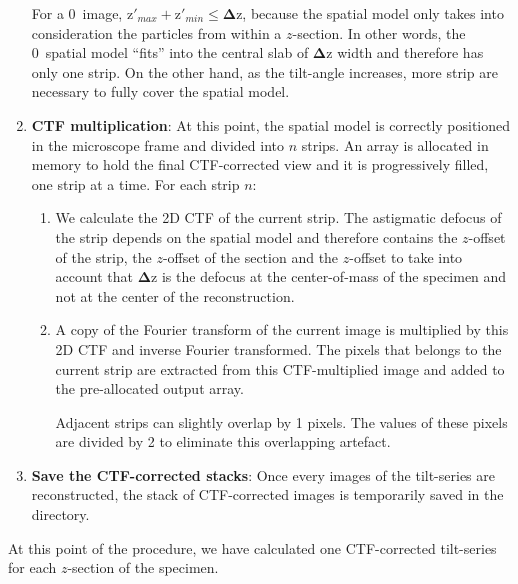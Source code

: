 \begin{enumerate}
    \begin{note}For a 0\textdegree\ image, $\bm{\mathrm{z}}'_{max} + \bm{\mathrm{z}}'_{min} \leqslant \bm{\Delta \mathrm{z}}$, because the spatial model only takes into consideration the particles from within a $z$-section. In other words, the 0\textdegree \ spatial model ``fits'' into the central slab of $\bm{\Delta \mathrm{z}}$ width and therefore has only one strip. On the other hand, as the tilt-angle increases, more strip are necessary to fully cover the spatial model.
    \end{note}
    
    \item \textbf{CTF multiplication}: At this point, the spatial model is correctly positioned in the microscope frame and divided into $n$ strips. An array is allocated in memory to hold the final CTF-corrected view and it is progressively filled, one strip at a time. For each strip $n$:
    \begin{enumerate}
        \item We calculate the 2D CTF of the current strip. The astigmatic defocus of the strip depends on the spatial model and therefore contains the $z$-offset of the strip, the $z$-offset of the section and the $z$-offset to take into account that $\bm{\Delta \mathrm{z}}$ is the defocus at the center-of-mass of the specimen and not at the center of the reconstruction.

        \item A copy of the Fourier transform of the current image is multiplied by this 2D CTF and inverse Fourier transformed. The pixels that belongs to the current strip are extracted from this CTF-multiplied image and added to the pre-allocated output array.
        
        \begin{note}Adjacent strips can slightly overlap by 1 pixels. The values of these pixels are divided by 2 to eliminate this overlapping artefact. 
        \end{note}
    \end{enumerate}
    
    \item \textbf{Save the CTF-corrected stacks}: Once every images of the tilt-series are reconstructed, the stack of CTF-corrected images is temporarily saved in the  directory.
\end{enumerate}

At this point of the procedure, we have calculated one CTF-corrected tilt-series for each $z$-section of the specimen.

